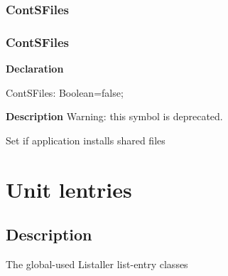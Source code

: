 \documentclass{report}
\newif\ifpdf
\begin{document}
\subsection*{\large{\textbf{ContSFiles}}\normalsize\hspace{1ex}\hrulefill}
\else
\subsection*{ContSFiles}
\fi
\label{ipkhandle-ContSFiles}
\begin{list}{}{
\setlength{\itemindent}{0cm}
\setlength{\listparindent}{0cm}
\setlength{\leftmargin}{\evensidemargin}
\addtolength{\leftmargin}{\tmplength}
\settowidth{\labelsep}{X}
\addtolength{\leftmargin}{\labelsep}
\setlength{\labelwidth}{\tmplength}
}
\item[\textbf{Declaration}\hfill]
\ifpdf
\begin{flushleft}
\fi
\begin{ttfamily}
ContSFiles: Boolean=false;\end{ttfamily}

\ifpdf
\end{flushleft}
\fi

\par
\item[\textbf{Description}]
Warning: this symbol is deprecated.

 Set if application installs shared files

\end{list}
\chapter{Unit lentries}
\label{lentries}
\section{Description}
The global{-}used Listaller list{-}entry classes
\end{document}
